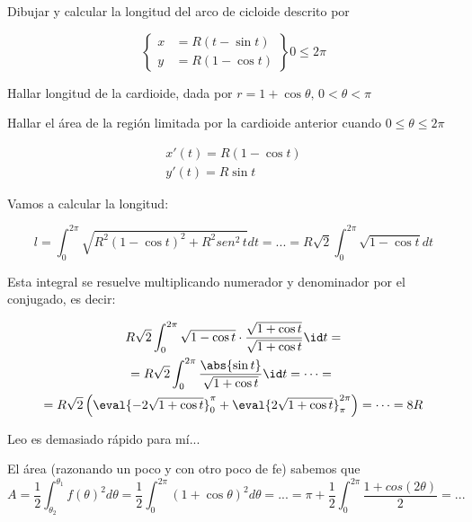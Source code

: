 \begin{problem}[3]
\ppart Dibujar y calcular la longitud del arco de cicloide descrito por

\[\left\{\begin{array}{cc}
x&=R(t-\sin t)\\
y&=R(1-\cos t)
\end{array}\right\}  0\leq2\pi\]

\ppart Hallar longitud de la cardioide, dada por $r = 1+\cos\theta,\,0<\theta<\pi$

\ppart Hallar el área de la región limitada por la cardioide anterior cuando $0\leq\theta\leq2\pi$

\solution

\spart

\begin{gather*}
x'(t) = R(1-\cos t)\\
y'(t) = R\sin t
\end{gather*}

Vamos a calcular la longitud:

\[l = \int_0^{2\pi}\sqrt{R^2(1-\cos t)^2 + R^2sen^2\,t}dt = ... = R\sqrt{2}\int_0^{2\pi} \sqrt{1-\cos t}dt\]

Esta integral se resuelve multiplicando numerador y denominador por el conjugado, es decir:

\begin{gather*}
R\sqrt{2}\int_0^{2\pi} \sqrt{1-\cos t}\cdot\frac{\sqrt{1+\cos t}}{\sqrt{1+\cos t}}\id t = \\ 
 = R\sqrt{2}\int_0^{2\pi} \frac{\abs{\sin t}}{\sqrt{1+\cos t}} \id t = \dotsb = \\
 = R\sqrt{2} \left(\eval{-2\sqrt{1+\cos t}}_0^{\pi} + \eval{2\sqrt{1+\cos t}}_{\pi}^{2\pi}\right) = \dotsb = 8R
\end{gather*}

\spart Leo es demasiado rápido para mí...

\spart 
El área (razonando un poco y con otro poco de fe) sabemos que
 \[A = \frac{1}{2} \int_{\theta_2}^{\theta_1}f(\theta)^2d\theta = 
\frac{1}{2} \int_{0}^{2\pi}(1+\cos \theta)^2d\theta = ... = \pi + \frac{1}{2}\int_0^{2\pi}\frac{1+cos(2\theta)}{2} = ... \]
\end{problem}


